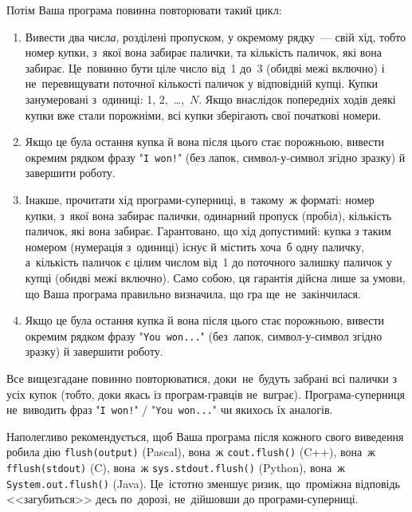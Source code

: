 Потім Ваша програма повинна повторювати такий цикл:
\begin{enumerate}
\item
Вивести два числ{\it а}, розділені пропуском, у окремому рядку~--- свій хід, тобто номер к{\it у}пки, з~якої вона забирає палички, та кількість паличок, які вона забирає.
Це~повинно бути ціле число від~1 до~3 (обидві межі включно) і не~перевищувати поточної кількості паличок у відповідній купці.
Купки занумеровані з~одиниці: 1, 2,~\dots,~$N$. Якщо внаслідок попередніх ходів деякі купки вже стали порожніми, всі купки зберігають свої початкові номери.
\item
Якщо це була остання купка й вона після цього стає порожньою, 
вивести окремим рядком фразу "\texttt{I~won!}"
(без лапок, символ-у-символ згідно зразку) й завершити роботу.
\item
Інакше, прочитати хід програми-суперниці, в~такому~ж форматі: номер к{\it у}пки, з~якої вона забирає палички, одинарний пропуск (пробіл), кількість паличок, які вона забирає.
Гарантовано, що хід допустимий: купка з таким номером (нумерація з~одиниці) існує й містить хоча~б одну паличку, а~кількість паличок є цілим числом від~1 до поточного залишку паличок у купці (обидві межі включно).
Само собою, ця гарантія дійсна лише за умови, що Ваша програма правильно визначила, що гра ще~не~закінчилася.
\item
Якщо це була остання купка й вона після цього стає порожньою, 
вивести окремим рядком фразу "\texttt{You~won...}"
(без~лапок, символ-у-символ згідно зразку) й завершити роботу.
\end{enumerate}
Все вищезгадане повинно повторюватися, доки~не~будуть забрані всі палички з усіх купок (тобто, доки якась із програм-гравців не~в{\it и}грає).
Програма-суперниця не~виводить фраз "\texttt{I~won!}" / "\texttt{You~won...}"
чи якихось їх аналогів.

Наполегливо рекомендується, щоб Ваша програма після кожного свого виведення 
робила дію \verb"flush(output)" (Pascal), 
вона~ж \verb"cout.flush()" (C++), 
вона~ж \verb"fflush(stdout)" (C), 
вона~ж \verb"sys.stdout.flush()" (Python),
вона~ж \verb"System.out.flush()" (Java).
Це~істотно зменшує ризик, 
що~проміжна відповідь <<загубиться>> десь по~дорозі, 
не~дійшовши до програми-суперниці.

\Example

\begin{example}
\end{example}


